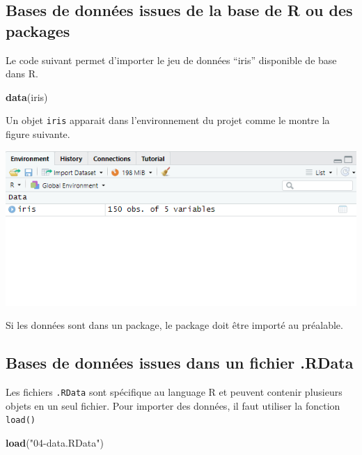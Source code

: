 \documentclass[
]{book}
\newenvironment{Shaded}{\begin{snugshade}}{\end{snugshade}}
\newcommand{\FunctionTok}[1]{\textcolor[rgb]{0.13,0.29,0.53}{\textbf{#1}}}
\newcommand{\NormalTok}[1]{#1}
\newcommand{\StringTok}[1]{\textcolor[rgb]{0.31,0.60,0.02}{#1}}
\begin{document}
\subsection{Bases de données issues de la base de R ou des packages}\label{bases-de-donnuxe9es-issues-de-la-base-de-r-ou-des-packages}

Le code suivant permet d'importer le jeu de données ``iris'' disponible de base dans R.

\begin{Shaded}
\begin{Highlighting}[]
\FunctionTok{data}\NormalTok{(iris)}
\end{Highlighting}
\end{Shaded}

Un objet \texttt{iris} apparait dans l'environnement du projet comme le montre la figure suivante.

\includegraphics[width=8.39in]{images/environment_forDataDownload}

Si les données sont dans un package, le package doit être importé au préalable.

\subsection{Bases de données issues dans un fichier .RData}\label{bases-de-donnuxe9es-issues-dans-un-fichier-.rdata}

Les fichiers \texttt{.RData} sont spécifique au language R et peuvent contenir plusieurs objets en un seul fichier. Pour importer des données, il faut utiliser la fonction \texttt{load()}

\begin{Shaded}
\begin{Highlighting}[]
\FunctionTok{load}\NormalTok{(}\StringTok{"04{-}data.RData"}\NormalTok{)}
\end{Highlighting}
\end{Shaded}
\end{document}
